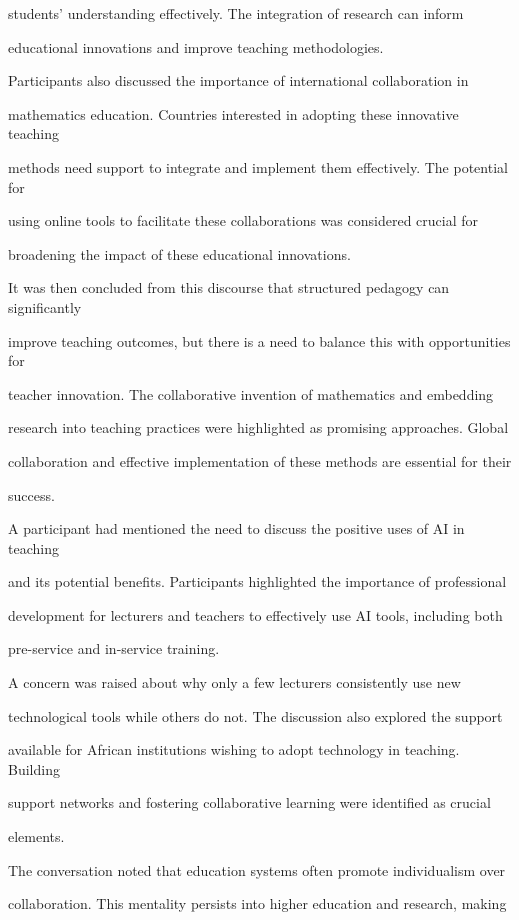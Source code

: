 \documentclass[11pt]{article}
\begin{document}
students' understanding effectively. The integration of research can inform

educational innovations and improve teaching methodologies.

Participants also discussed the importance of international collaboration in

mathematics education. Countries interested in adopting these innovative teaching

methods need support to integrate and implement them effectively. The potential for

using online tools to facilitate these collaborations was considered crucial for

broadening the impact of these educational innovations.

It was then concluded from this discourse that structured pedagogy can significantly

improve teaching outcomes, but there is a need to balance this with opportunities for

teacher innovation. The collaborative invention of mathematics and embedding

research into teaching practices were highlighted as promising approaches. Global

collaboration and effective implementation of these methods are essential for their

success.

A participant had mentioned the need to discuss the positive uses of AI in teaching

and its potential benefits. Participants highlighted the importance of professional

development for lecturers and teachers to effectively use AI tools, including both

pre-service and in-service training.

A concern was raised about why only a few lecturers consistently use new

technological tools while others do not. The discussion also explored the support

available for African institutions wishing to adopt technology in teaching. Building

support networks and fostering collaborative learning were identified as crucial

elements.

The conversation noted that education systems often promote individualism over

collaboration. This mentality persists into higher education and research, making
\end{document}
